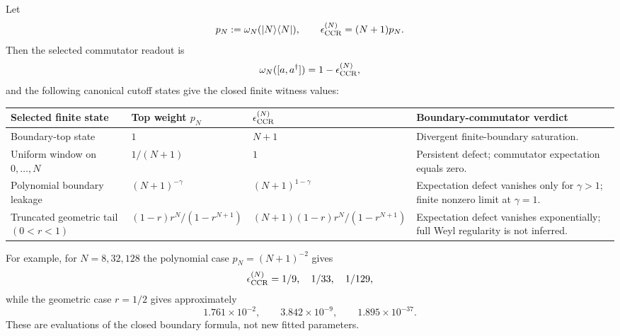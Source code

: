 \documentclass[12pt,a4paper]{article}
\begin{document}
\begin{proposition}
\label{p12:prop:executable-ccr-boundary-witness-numerics}
Let
\[
 p_N:=\omega_N(|N\rangle\langle N|),
 \qquad
 \epsilon_{\rm CCR}^{(N)}=(N+1)p_N.
\]
Then the selected commutator readout is
\[
 \omega_N([a,a^\dagger])=1-\epsilon_{\rm CCR}^{(N)},
\]
and the following canonical cutoff states give the closed finite witness values:
\begin{center}
\scriptsize
\renewcommand{\arraystretch}{1.12}
\begin{tabularx}{0.96\textwidth}{@{}
>{\raggedright\arraybackslash}p{}
>{\raggedright\arraybackslash}p{}
>{\raggedright\arraybackslash}p{}
>{\raggedright\arraybackslash}X
@{}}
\toprule
Selected finite state & Top weight \(p_N\) & \(\epsilon_{\rm CCR}^{(N)}\) & Boundary-commutator verdict \\
\midrule
Boundary-top state & \(1\) & \(N+1\) & Divergent finite-boundary saturation. \\
Uniform window on \(0,\ldots,N\) & \(1/(N+1)\) & \(1\) & Persistent defect; commutator expectation equals zero. \\
Polynomial boundary leakage & \((N+1)^{-\gamma}\) & \((N+1)^{1-\gamma}\) & Expectation defect vanishes only for \(\gamma>1\); finite nonzero limit at \(\gamma=1\). \\
Truncated geometric tail \((0<r<1)\) & \((1-r)r^N/(1-r^{N+1})\) & \((N+1)(1-r)r^N/(1-r^{N+1})\) & Expectation defect vanishes exponentially; full Weyl regularity is not inferred. \\
\bottomrule
\end{tabularx}
\end{center}
For example, for \(N=8,32,128\) the polynomial case \(p_N=(N+1)^{-2}\) gives
\[
\epsilon_{\rm CCR}^{(N)}=1/9,\quad 1/33,\quad 1/129,
\]
while the geometric case \(r=1/2\) gives approximately
\[
1.761\times10^{-2},\qquad3.842\times10^{-9},\qquad1.895\times10^{-37}.
\]
These are evaluations of the closed boundary formula, not new fitted parameters.
\end{proposition}
\end{document}
